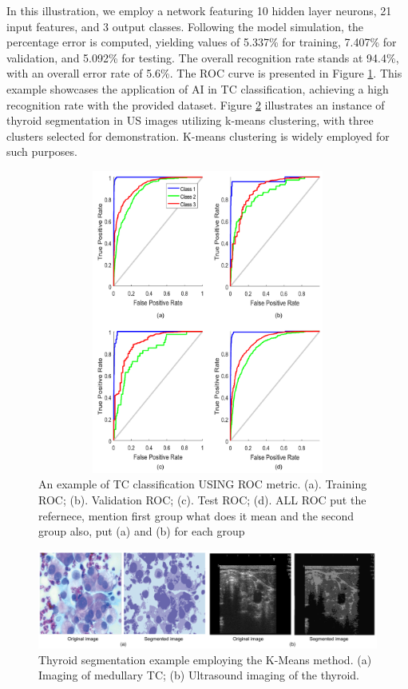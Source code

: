 \documentclass[a4paper,fleqn]{cas-sc}
\begin{document}
In this illustration, we employ a network featuring 10 hidden layer neurons, 21 input features, and 3 output classes. Following the model simulation, the percentage error is computed, yielding values of 5.337\% for training, 7.407\% for validation, and 5.092\% for testing. The overall recognition rate stands at 94.4\%, with an overall error rate of 5.6\%. The \ac{ROC}  curve is presented in Figure \ref{fig10}. This example showcases the application of \ac{AI}  in TC classification, achieving a high recognition rate with the provided dataset. Figure \ref{fig11} illustrates an instance of thyroid segmentation in \ac{US} images utilizing k-means clustering, with three clusters selected for demonstration. K-means clustering is widely employed for such purposes.


\begin{figure}[t!]
\centering
\includegraphics[width=12cm, height=10cm]{fig10.pdf}
\caption{An example of TC classification USING \ac{ROC} metric. (a). Training \ac{ROC}; (b). Validation \ac{ROC}; (c). Test \ac{ROC}; (d). ALL \ac{ROC} put the refernece, mention first group what does it mean and the second group also, put (a) and (b) for each group}
\label{fig10}
\end{figure}



\begin{figure}[t!]
\centering
\includegraphics[width=1\columnwidth]{fig11.pdf}
\caption{ Thyroid segmentation example employing the K-Means method. (a) Imaging of medullary \ac{TC}; (b) Ultrasound imaging of the thyroid.}
\label{fig11}
\end{figure}
\end{document}
